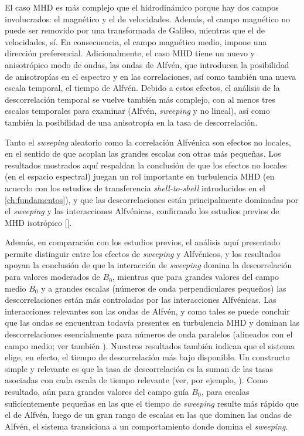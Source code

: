 El caso MHD es más complejo que el hidrodinámico porque hay dos campos
involucrados: el magnético y el de velocidades. Además, el campo
magnético no puede ser removido por una transformada de Galileo,
mientras que el de velocidades, sí. En consecuencia, el campo
magnético medio, impone una dirección preferencial. Adicionalmente, el
caso MHD tiene un nuevo y anisotrópico modo de ondas, las ondas de
Alfvén, que introducen la posibilidad de anisotropías en el espectro y
en las correlaciones, así como también una nueva escala temporal, el
tiempo de Alfvén. Debido a estos efectos, el análisis de la
descorrelación temporal se vuelve también más complejo, con al menos
tres escalas temporales para examinar (Alfvén, \textit{sweeping} y no lineal),
así como también la posibilidad de una anisotropía en la tasa de
descorrelación.

Tanto el \textit{sweeping} aleatorio como la correlación Alfvénica son efectos
no locales, en el sentido de que acoplan las grandes escalas con otras
más pequeñas. Los resultados mostrados aquí respaldan la conclusión de
que los efectos no locales (en el espacio espectral) juegan un rol
importante en turbulencia MHD (en acuerdo con los estudios de
transferencia \textit{shell-to-shell} introducidos en el \cref{ch:fundamentos}),
y que las descorrelaciones están principalmente dominadas por el
\textit{sweeping} y las interacciones Alfvénicas, confirmado los estudios
previos de MHD isotrópico [\cite{servidio_time_2011}].

Además, en comparación con los estudios previos, el análisis aquí
presentado permite distinguir entre los efectos de \textit{sweeping} y
Alfvénicos, y los resultados apoyan la conclusión de que la
interacción de \textit{sweeping} domina la descorrelación para valores
moderados de $B_0$, mientras que para grandes valores del campo medio
$B_0$ y a grandes escalas (números de onda perpendiculares pequeños)
las descorrelaciones están más controladas por las interacciones
Alfvénicas.  Las interacciones relevantes son las ondas de Alfvén, y
como tales se puede concluir que las ondas se encuentran todavía
presentes en turbulencia MHD y dominan las descorrelaciones
esencialmente para números de onda paralelos (alineados con el campo
medio; ver también \cite{meyrand_direct_2016,
  meyrand_weak_2015}). Nuestros resultados también indican que el
sistema elige, en efecto, el tiempo de descorrelación más bajo
disponible. Un constructo simple y relevante es que la tasa de
descorrelación es la suman de las tasas asociadas con cada escala de
tiempo relevante (ver, por ejemplo, \cite{pouquet_strong_1976,
  zhou_magnetohydrodynamic_2004}). Como resultado, aún para grandes
valores del campo guía $B_0$, para escalas suficientemente pequeñas en
las que el tiempo de \textit{sweeping} resulte más rápido que el de Alfvén,
luego de un gran rango de escalas en las que dominen las ondas de
Alfvén, el sistema transiciona a un comportamiento donde domina el
\textit{sweeping}.


